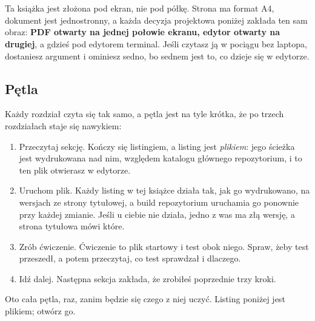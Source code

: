 \chapter*{\lblHowToUse}
{}
\markboth{\lblHowToUse}{\lblHowToUse}

\noindent
Ta książka jest złożona pod ekran, nie pod półkę. Strona ma format A4,
dokument jest jednostronny, a każda decyzja projektowa poniżej zakłada ten sam
obraz: \textbf{PDF otwarty na jednej połowie ekranu, edytor otwarty na
drugiej}, a gdzieś pod edytorem terminal. Jeśli czytasz ją w pociągu bez
laptopa, dostaniesz argument i ominiesz sedno, bo sednem jest to, co dzieje
się w edytorze.

\section*{Pętla}

Każdy rozdział czyta się tak samo, a pętla jest na tyle krótka, że po trzech
rozdziałach staje się nawykiem:

\begin{enumerate}[leftmargin=1.6em, itemsep=3pt]
  \item Przeczytaj sekcję. Kończy się listingiem, a listing jest
        \emph{plikiem}: jego ścieżka jest wydrukowana nad nim, względem
        katalogu głównego repozytorium, i to ten plik otwierasz w edytorze.
  \item Uruchom plik. Każdy listing w tej książce działa tak, jak go
        wydrukowano, na wersjach ze strony tytułowej, a build repozytorium
        uruchamia go ponownie przy każdej zmianie. Jeśli u ciebie nie działa,
        jedno z was ma złą wersję, a strona tytułowa mówi które.
  \item Zrób ćwiczenie. Ćwiczenie to plik startowy i test obok niego. Spraw,
        żeby test przeszedł, a potem przeczytaj, co test sprawdzał i dlaczego.
  \item Idź dalej. Następna sekcja zakłada, że zrobiłeś poprzednie trzy kroki.
\end{enumerate}

\noindent
{}

Oto cała pętla, raz, zanim będzie się czego z niej uczyć. Listing poniżej
jest plikiem; otwórz go.


